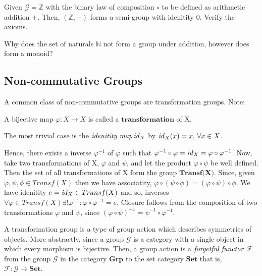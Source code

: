 \begin{exmp}
 Given $\mathcal{G} = \mathbb{Z}$ with the binary law of composition $\circ$ to be defined as arithmetic addition $+$.
 Then, $(\mathbb{Z}, +)$ forms a semi-group with idenitity $0$. Verify the axioms.
\end{exmp}


\begin{question}
 Why does the set of naturals $\mathbb{N}$ not form a group under addition, however does form a monoid?
\end{question}


\subsection{Non-commutative Groups} %
\label{sec:noncommutative-groups}
A common class of non-commutative groups are transformation groups.
Note:
\begin{defn}[Transformation]
 A bijective map $\varphi: X \to X$ is called a $\textbf{transformation}$ of X.
 \begin{note}
  The most trivial case is the $\emph{idenitity map} \, \mathit{id}_{X}$ by $\mathit{id}_{X}(x) = x, \, \forall x \in X$.
 \end{note}
\end{defn}
Hence, there exists a inverse $\varphi^{-1}$ of $\varphi$ such that $\varphi^{-1} \circ \varphi = \mathit{id}_{X} = \varphi \circ \varphi^{-1}$.
Now, take two transformations of X, $\varphi$ and $\psi$, and let the product $\varphi \circ \psi$ be well defined.
Then the set of all transformations of X form the group $\textbf{Transf(X)}$.
Since, given $\varphi , \psi , \phi \in Transf(X)$ then we have associatity, $\varphi \circ (\psi \circ \phi) = (\varphi \circ \psi) \circ \phi$.
We have idenitity $e = \mathit{id}_{X} \in Transf(X)$ and so, inverses $\forall \varphi \in Transf(X) \exists ! \varphi^{-1} : \varphi \circ \varphi^{-1} = e$.
Closure follows from the composition of two transformations $\varphi$ and $\psi$, since $(\varphi \circ \psi)^{-1} = \psi^{-1} \circ \varphi^{-1}$.

A transformation group is a type of group action which describes symmetries of objects. More abstractly,
since a group $\mathcal{G}$ is a category with a single object in which every morphism is bijective.
Then, a group action is a $\emph{forgetful functor}$ $\mathcal{F}$ from the group $\mathcal{G}$ in the category $\textbf{Grp}$
to the set category $\textbf{Set}$ that is, $\mathcal{F} : \mathcal{G} \to \textbf{Set}$.

